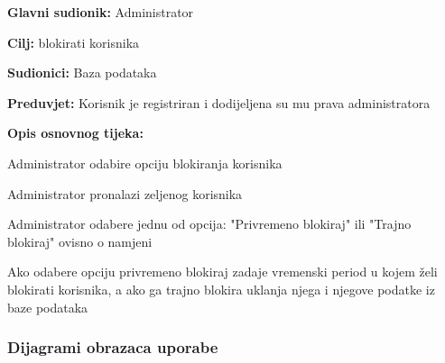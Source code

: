 					\noindent {}
					\begin{packed_item}
						
						\item \textbf{Glavni sudionik: } Administrator
						\item  \textbf{Cilj:} blokirati korisnika
						\item  \textbf{Sudionici:} Baza podataka
						\item  \textbf{Preduvjet:} Korisnik je registriran i dodijeljena su mu prava administratora
						
						\item  \textbf{Opis osnovnog tijeka:} 
						
						\item[] \begin{packed_enum}
							
							\item Administrator odabire opciju blokiranja korisnika
							
							
							\item Administrator pronalazi zeljenog korisnika
							
							\item Administrator odabere jednu od opcija: "Privremeno blokiraj" ili "Trajno blokiraj" ovisno o namjeni 
							
							\item Ako odabere opciju privremeno blokiraj zadaje vremenski period u kojem želi blokirati korisnika, a ako ga trajno blokira uklanja njega i njegove podatke iz baze podataka
							
							
							
						\end{packed_enum}
						
					\end{packed_item}
				\eject
					
				\subsubsection{Dijagrami obrazaca uporabe}
					
					
					
